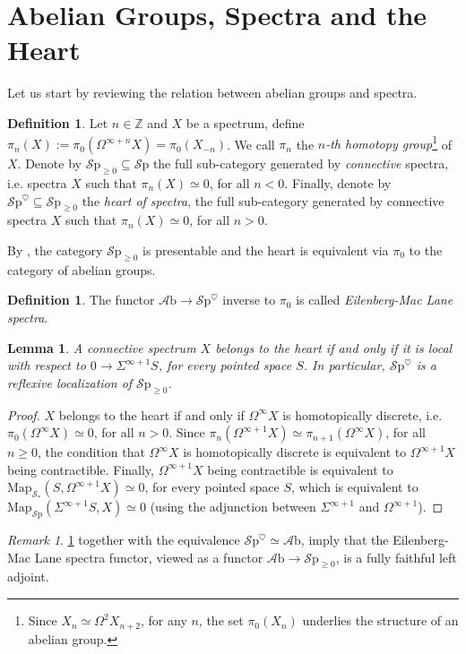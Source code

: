 \documentclass[10pt]{amsart}
\newcommand{\s}{\mathscr{S}}
\newcommand{\bZ}{\mathbb{Z}}
\newcommand{\Map}{\mathrm{Map}}
\newcommand{\Sp}{\mathscr{S}\mathrm{p}}
\newcommand{\Ab}{\mathscr{A}\mathrm{b}}
\newtheorem{lemma}[equation]{Lemma}
\theoremstyle{definition}
\newtheorem{definition}[equation]{Definition}
\theoremstyle{remark}
\newtheorem{remark}[equation]{Remark}
\begin{document}
\section{Abelian Groups, Spectra and the Heart}
Let us start by reviewing the relation between abelian groups and spectra. 
\begin{definition}
    Let $n\in\bZ$ and $X$ be a spectrum, define $\pi_n(X):=\pi_0(\Omega^{\infty+n}X)=\pi_0(X_{-n})$. We call $\pi_n$ the \textit{$n$-th homotopy group}\footnote{Since $X_n\simeq\Omega^2X_{n+2}$, for any $n$, the set $\pi_0(X_n)$ underlies the structure of an abelian group.} of $X$. Denote by $\Sp_{\geq0}\subseteq\Sp$ the full sub-category generated by \textit{connective} spectra, i.e. spectra $X$ such that $\pi_n(X)\simeq0$, for all $n<0$. Finally, denote by $\Sp^\heartsuit\subseteq\Sp_{\geq0}$ the \emph{heart of spectra}, the full sub-category generated by connective spectra $X$ such that $\pi_n(X)\simeq0$, for all $n>0$. 
\end{definition}
By \cite[Proposition 1.4.3.6]{lurie2017ha}, the category $\Sp_{\geq0}$ is presentable and the heart is equivalent via $\pi_0$ to the category of abelian groups. 
\begin{definition}
  The functor $\Ab\to\Sp^\heartsuit$ inverse to $\pi_0$ is called \emph{Eilenberg-Mac Lane spectra}. 
\end{definition}
\begin{lemma}\label{refheart}
  A connective spectrum $X$ belongs to the heart if and only if it is local with respect to $0\to\Sigma^{\infty+1}S$, for every pointed space $S$. In particular, $\Sp^\heartsuit$ is a reflexive localization of $\Sp_{\geq0}$. 
\end{lemma}
\begin{proof}
  $X$ belongs to the heart if and only if $\Omega^\infty X$ is homotopically discrete, i.e. $\pi_0(\Omega^{\infty}X)\simeq0$, for all $n>0$. Since $\pi_n(\Omega^{\infty+1}X)\simeq\pi_{n+1}(\Omega^\infty X)$, for all $n\geq0$, the condition that $\Omega^{\infty}X$ is homotopically discrete is equivalent to $\Omega^{\infty+1}X$ being contractible. Finally, $\Omega^{\infty+1}X$ being contractible is equivalent to $\Map_{\s_*}(S,\Omega^{\infty+1}X)\simeq 0$, for every pointed space $S$, which is equivalent to $\Map_{\Sp}(\Sigma^{\infty+1}S,X)\simeq0$ (using the adjunction between $\Sigma^{\infty+1}$ and $\Omega^{\infty+1}$).
\end{proof}
\begin{remark}
  \cref{refheart} together with the equivalence $\Sp^\heartsuit\simeq\Ab$, imply that the Eilenberg-Mac Lane spectra functor, viewed as a functor $\Ab\to\Sp_{\geq0}$, is a fully faithful left adjoint. 
\end{remark}
\end{document}
